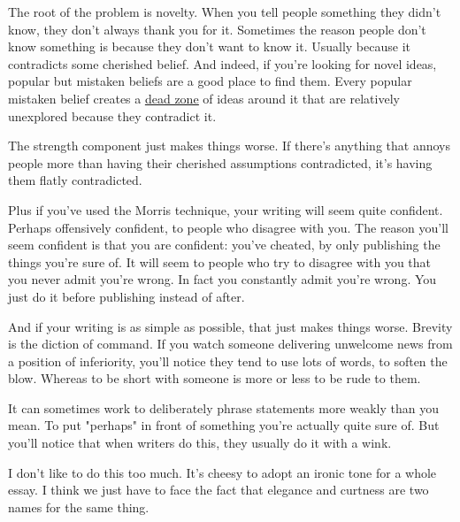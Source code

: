 The root of the problem is novelty. When you
                  tell people something they didn't know, they don't always
                  thank you for it. Sometimes the reason people don't know
                  something is because they don't want to know it. Usually
                  because it contradicts some cherished belief. And indeed, if
                  you're looking for novel ideas, popular but mistaken beliefs
                  are a good place to find them. Every popular mistaken belief
                  creates a \href{http://www.paulgraham.com/nov.html}{\underline{dead zone}} of ideas
                  around it that are relatively unexplored because they
                  contradict it.

The strength component just makes
                  things worse. If there's anything that annoys people more than
                  having their cherished assumptions contradicted, it's having
                  them flatly contradicted.

Plus if you've used the
                  Morris technique, your writing will seem quite confident.
                  Perhaps offensively confident, to people who disagree with
                  you. The reason you'll seem confident is that you are
                  confident: you've cheated, by only publishing the things
                  you're sure of. It will seem to people who try to disagree
                  with you that you never admit you're wrong. In fact you
                  constantly admit you're wrong. You just do it before
                  publishing instead of after.

And if your writing is
                  as simple as possible, that just makes things worse. Brevity
                  is the diction of command. If you watch someone delivering
                  unwelcome news from a position of inferiority, you'll notice
                  they tend to use lots of words, to soften the blow. Whereas to
                  be short with someone is more or less to be rude to them.

It
                  can sometimes work to deliberately phrase statements more
                  weakly than you mean. To put "perhaps" in front of something
                  you're actually quite sure of. But you'll notice that when
                  writers do this, they usually do it with a wink.

I
                  don't like to do this too much. It's cheesy to adopt an ironic
                  tone for a whole essay. I think we just have to face the fact
                  that elegance and curtness are two names for the same
                  thing.

